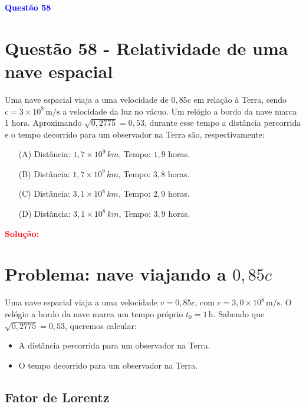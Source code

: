 \documentclass[a4paper,12pt]{article}
\begin{document}
\begin{flushleft}
\textbf{\textcolor{blue}{\Large Quest\~ao 58}}\\
\noindent
\section{Quest\~ao 58 - Relatividade de uma nave espacial}
Uma nave espacial viaja a uma velocidade de \(0{,}85c\) em relação à Terra, sendo \(c = 3 \times 10^8\, \mathrm{m/s}\) 
a velocidade da luz no vácuo. Um relógio a bordo da nave marca 1 hora. Aproximando \( \sqrt{0{,}2775} = 0{,}53 \), 
durante esse tempo a distância percorrida e o tempo decorrido para um observador na Terra são, respectivamente:


\begin{itemize}
\item[(A)] Distância: \(1{,}7 \times 10^9\, km\), Tempo: \(1{,}9\) horas.
\item[(B)] Distância: \(1{,}7 \times 10^9\, km\), Tempo: \(3{,}8\) horas.
\item[(C)] Distância: \(3{,}1 \times 10^8\, km\), Tempo: \(2{,}9\) horas.
\item[(D)] Distância: \(3{,}1 \times 10^8\, km\), Tempo: \(3{,}9\) horas.
\end{itemize}

\vspace{0.5cm}

\textcolor{red}{\textbf{Solução:}}\\

\section*{Problema: nave viajando a \(0{,}85c\)}

Uma nave espacial viaja a uma velocidade \(v = 0{,}85c\), com \(c = 3{,}0 \times 10^8\, \mathrm{m/s}\).  
O relógio a bordo da nave marca um tempo próprio \(t_0 = 1\,\mathrm{h}\).  
Sabendo que \(\sqrt{0{,}2775} = 0{,}53\), queremos calcular:

\begin{itemize}
    \item A distância percorrida para um observador na Terra.
    \item O tempo decorrido para um observador na Terra.
\end{itemize}

\subsection*{Fator de Lorentz}


\end{flushleft}
\end{document}
